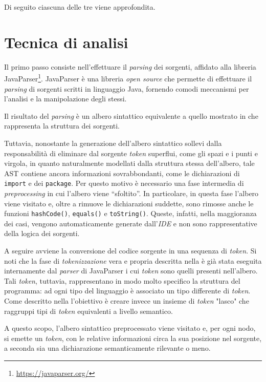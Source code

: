 Di seguito ciascuna delle tre viene approfondita.

\section{Tecnica di analisi}
Il primo passo consiste nell'effettuare il \textit{parsing} dei sorgenti, affidato alla libreria JavaParser\footnote{\url{https://javaparser.org/}}.
%
JavaParser è una libreria \textit{open source} che permette di effettuare il \textit{parsing} di sorgenti scritti in linguaggio Java, fornendo comodi meccanismi per l'analisi e la manipolazione degli stessi.

Il risultato del \textit{parsing} è un albero sintattico equivalente a quello mostrato in  che rappresenta la struttura dei sorgenti.

Tuttavia, nonostante la generazione dell'albero sintattico sollevi dalla responsabilità di eliminare dal sorgente \textit{token} superflui, come gli spazi e i punti e virgola, in quanto naturalmente modellati dalla struttura stessa dell'albero, tale AST contiene ancora informazioni sovrabbondanti, come le dichiarazioni di \texttt{import} e dei \texttt{package}.
%
Per questo motivo è necessario una fase intermedia di \textit{preprocessing} in cui l'albero viene “sfoltito”. In particolare, in questa fase l'albero viene visitato e, oltre a rimuove le dichiarazioni suddette, sono rimosse anche le funzioni \texttt{hashCode()}, \texttt{equals()} e \texttt{toString()}.
%
Queste, infatti, nella maggioranza dei casi, vengono automaticamente generate dall'\textit{IDE} e non sono rappresentative della logica dei sorgenti.

A seguire avviene la conversione del codice sorgente in una sequenza di \textit{token}.
%
Si noti che la fase di \textit{tokenizzazione} vera e propria descritta nella  è già stata eseguita internamente dal \textit{parser} di JavaParser i cui \textit{token} sono quelli presenti nell'albero.
%
Tali \textit{token}, tuttavia, rappresentano in modo molto specifico la struttura del programma: ad ogni tipo del linguaggio è associato un tipo differente di \textit{token}.
%
Come descritto nella  l'obiettivo è creare invece un insieme di \textit{token} "lasco" che raggruppi tipi di \textit{token} equivalenti a livello semantico.

A questo scopo, l'albero sintattico preprocessato viene visitato e, per ogni nodo, si emette un \textit{token}, con le relative informazioni circa la sua posizione nel sorgente, a seconda sia una dichiarazione semanticamente rilevante o meno.

